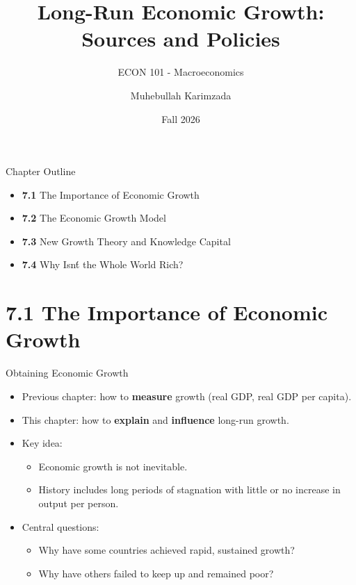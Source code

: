 \documentclass[aspectratio=169]{beamer}
\title{\textbf{Long-Run Economic Growth: Sources and Policies \vspace{.5cm}\\  }}
\subtitle{ {\large ECON 101 - Macroeconomics}}
\author{Muhebullah Karimzada}
\date{Fall 2026}
\begin{document}
\begin{frame}[plain]
  \titlepage
\end{frame}

\begin{frame}{Chapter Outline}
\transfade
\begin{itemize}[<+->]
  \item \textbf{7.1} The Importance of Economic Growth
  \item \textbf{7.2} The Economic Growth Model
  \item \textbf{7.3} New Growth Theory and Knowledge Capital
  \item \textbf{7.4} Why Isn\'t the Whole World Rich?
\end{itemize}
\end{frame}

\section{7.1 The Importance of Economic Growth}

\begin{frame}{Obtaining Economic Growth}
\transfade
\begin{itemize}[<+->]
  \item Previous chapter: how to \textbf{measure} growth (real GDP, real GDP per capita).
  \item This chapter: how to \textbf{explain} and \textbf{influence} long-run growth.
  \item Key idea:
  \begin{itemize}[<+->]
    \item Economic growth is \alert{not inevitable}.
    \item History includes long periods of stagnation with little or no increase in output per person.
  \end{itemize}
  \item Central questions:
  \begin{itemize}[<+->]
    \item Why have some countries achieved rapid, sustained growth?
    \item Why have others failed to keep up and remained poor?
  \end{itemize}
\end{itemize}
\end{frame}
\end{document}
